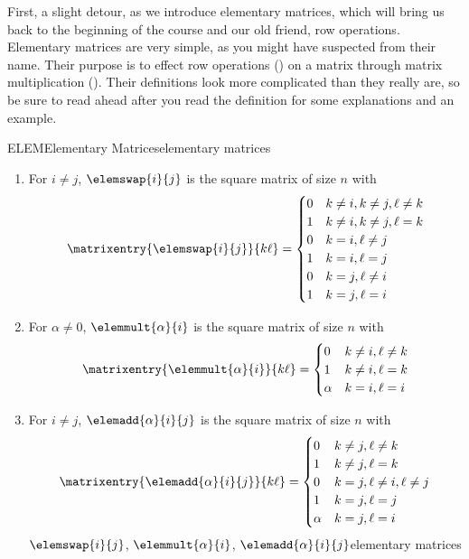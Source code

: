 %
First, a slight detour, as we introduce elementary matrices, which will bring us back to the beginning of the course and our old friend, row operations.
%
%
Elementary matrices are very simple, as you might have suspected from their name.  Their purpose is to effect row operations () on a matrix through matrix multiplication ().  Their definitions look more complicated than they really are, so be sure to read ahead after you read the definition for some explanations and an example.
%
\begin{definition}{ELEM}{Elementary Matrices}{elementary matrices}
\begin{enumerate}
\item For $i\neq j$, $\elemswap{i}{j}$ is the square matrix of size $n$ with 
%
\begin{equation*}
\matrixentry{\elemswap{i}{j}}{k\ell}=
\begin{cases}
0 & k\neq i, k\neq j, \ell\neq k\\
1 & k\neq i, k\neq j, \ell=k\\
0 & k=i, \ell\neq j\\
1 & k=i, \ell=j\\
0 & k=j, \ell\neq i\\
1 & k=j, \ell=i
\end{cases}
\end{equation*}
%
\item For $\alpha\neq 0$, $\elemmult{\alpha}{i}$ is the square matrix of size $n$ with 
%
\begin{equation*}
\matrixentry{\elemmult{\alpha}{i}}{k\ell}=
\begin{cases}
0        & k\neq i, \ell\neq k\\
1        & k\neq i, \ell=k\\
\alpha & k=i, \ell=i
\end{cases}
\end{equation*}
%
\item For $i\neq j$, $\elemadd{\alpha}{i}{j}$ is the square matrix of size $n$ with 
%
\begin{equation*}
\matrixentry{\elemadd{\alpha}{i}{j}}{k\ell}=
\begin{cases}
0 & k\neq j, \ell\neq k\\
1 & k\neq j, \ell=k\\
0 & k=j, \ell\neq i, \ell\neq j\\
1 & k=j, \ell=j\\
\alpha & k=j, \ell=i\\
\end{cases}
\end{equation*}
%
{$\elemswap{i}{j}$, $\elemmult{\alpha}{i}$, $\elemadd{\alpha}{i}{j}$}{elementary matrices}
\end{enumerate}
\end{definition}
